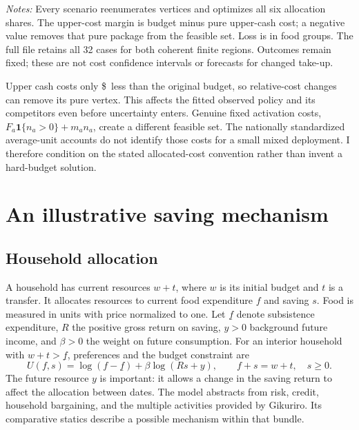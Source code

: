\documentclass[11pt]{article}
\newcommand{\ind}{\mathbf{1}}
\begin{document}
\begin{table}[t]
\centering\caption{Diversified mean-loss bounds under selected cost scenarios}\label{tab:costs}
\resizebox{\textwidth}{!}{}
\begin{minipage}{\textwidth}\footnotesize\emph{Notes:} Every scenario reenumerates vertices and optimizes all six allocation shares. The upper-cost margin is budget minus pure upper-cash cost; a negative value removes that pure package from the feasible set. Loss is in food groups. The full file retains all 32 cases for both coherent finite regions. Outcomes remain fixed; these are not cost confidence intervals or forecasts for changed take-up.\end{minipage}
\end{table}

Upper cash costs only \$\ProviderSavingUpper\ less than the original budget, so relative-cost changes can remove its pure vertex. This affects the fitted observed policy and its competitors even before uncertainty enters. Genuine fixed activation costs, $F_a\ind\{n_a>0\}+m_an_a$, create a different feasible set. The nationally standardized average-unit accounts do not identify those costs for a small mixed deployment. I therefore condition on the stated allocated-cost convention rather than invent a hard-budget solution.

\section{An illustrative saving mechanism}\label{app:saving}
\subsection{Household allocation}

A household has current resources $w+t$, where $w$ is its initial budget and $t$ is a transfer. It allocates resources to current food expenditure $f$ and saving $s$. Food is measured in units with price normalized to one. Let $\underline f$ denote subsistence expenditure, $R$ the positive gross return on saving, $y>0$ background future income, and $\beta>0$ the weight on future consumption. For an interior household with $w+t>\underline f$, preferences and the budget constraint are
\begin{equation}
 U(f,s)=\log(f-\underline f)+\beta\log(Rs+y),\qquad
 f+s=w+t,\quad s\geq0. \label{eq:household}
\end{equation}
The future resource $y$ is important: it allows a change in the saving return to affect the allocation between dates. The model abstracts from risk, credit, household bargaining, and the multiple activities provided by Gikuriro. Its comparative statics describe a possible mechanism within that bundle.
\end{document}
